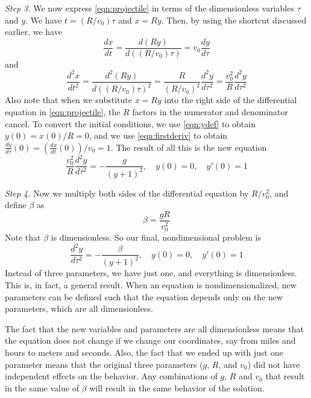 \vspace{0.1cm}
\noindent
\emph{Step 3.}
We now express \eqref{eqn:projectile} in terms of the dimensionless variables
$\tau$ and $y$.  We have $t = (R/v_0)\tau$ and $x = Ry$.
Then, by using the shortcut discussed earlier, we have
\begin{equation}
   \frac{dx}{dt} = \frac{d(Ry)}{d\left((R/v_0)\tau\right)}
      = v_0\frac{dy}{d\tau}
   \label{eqn:firstderiv}
\end{equation}
and
\begin{equation}
   \frac{d^2x}{dt^2} = \frac{d^2 (Ry)}{d\left((R/v_0)\tau\right)^2}
      = \frac{R}{(R/v_0)^2}\frac{d^2y}{d\tau^2}
      = \frac{v_0^2}{R}\frac{d^2y}{d\tau^2}
\end{equation}
Also note that when we substitute $x = Ry$ into the right side of the
differential equation in \eqref{eqn:projectile}, the $R$ factors in the
numerator and denominator cancel.
To convert the initial conditions, we use \eqref{eqn:ydef}
to obtain $y(0) = x(0)/R = 0$, and we use \eqref{eqn:firstderiv}
to obtain $\frac{dy}{d\tau}(0) = \left(\frac{dx}{dt}(0)\right)/v_0 = 1$.
The result of all this is the new equation
\begin{equation}
   \frac{v_0^2}{R} \frac{d^2y}{d\tau^2} = -\frac{g}{(y+1)^2},
      \quad y(0)=0, \quad y'(0)=1
\end{equation}

\vspace{0.1cm}
\noindent
\emph{Step 4.}
Now we multiply both sides of the differential equation by
$R/v_0^2$, and define $\beta$ as
\begin{equation}
   \beta = \frac{gR}{v_0^2}
\end{equation}
Note that $\beta$ is dimensionless.
So our final, nondimensional problem is
\begin{equation}
   \frac{d^2y}{d\tau^2} = -\frac{\beta}{(y+1)^2},
      \quad y(0)=0, \quad y'(0)=1
\end{equation}
Instead of three parameters, we have just one, and everything
is dimensionless.
This is, in fact, a general result.  When an equation
is nondimensionalized, new parameters can be defined such
that the equation depends only on the new parameters, which are
all dimensionless.
 
The fact that the new variables
and parameters are all dimensionless means that the equation does not change
if we change our coordinates, say from miles and hours to meters and seconds.
Also, the fact that we ended up with just one parameter means that
the original three parameters ($g$, $R$, and $v_0$) did not have
independent effects on the behavior.  Any combinations of
$g$, $R$ and $v_0$ that result in the same value of $\beta$
will result in the same behavior of the solution.

